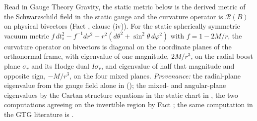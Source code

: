 Read in Gauge Theory Gravity, the static metric below is the derived metric of the Schwarzschild field in the static gauge and the curvature operator is $\mathcal{R}(B)$ on physical bivectors (Fact , clause (iv)). For the static spherically symmetric vacuum metric $f\,dt_s^2 - f^{-1}dr^2 - r^2(d\theta^2 + \sin^2\theta\,d\varphi^2)$ with $f = 1 - 2M/r$, the curvature operator on bivectors is diagonal on the coordinate planes of the orthonormal frame, with eigenvalue of one magnitude, $2M/r^3$, on the radial boost plane $\sigma_r$ and its Hodge dual $I\sigma_r$, and eigenvalue of half that magnitude and opposite sign, $-M/r^3$, on the four mixed planes. \emph{Provenance:} the radial-plane eigenvalue from the gauge field alone in \cite[Prop.~2.4(1)]{ButlerT5} (); the mixed- and angular-plane eigenvalues by the Cartan structure equations in the static chart in \cite[App.~A]{ButlerT5}, the two computations agreeing on the invertible region by Fact ; the same computation in the GTG literature is \cite[Ch.~14]{DoranLasenby2003}.
